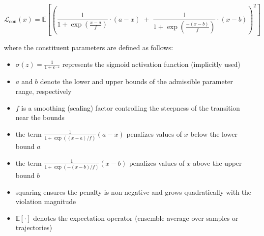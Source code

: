 \documentclass[11pt, oneside]{article}
\begin{document}

\begin{equation}
    \mathcal{L_{\mathrm{con}}}(x) = \mathbb{E}\left[\left(
        \frac{1}{1 + \exp\!\left(\tfrac{x-a}{f}\right)} \cdot (a-x) \;+\;
        \frac{1}{1 + \exp\!\left(\frac{-(x-b)}{f}\right)} \cdot (x-b)
        \right)^{2}\right]
\end{equation}

where the constituent parameters are defined as follows:
\begin{itemize}
    \item $\sigma(z) = \tfrac{1}{1+e^{-z}}$ represents the sigmoid activation function (implicitly used)
    \item $a$ and $b$ denote the lower and upper bounds of the admissible parameter range, respectively
    \item $f$ is a smoothing (scaling) factor controlling the steepness of the transition near the bounds
    \item the term $\tfrac{1}{1+\exp((x-a)/f)}(a-x)$ penalizes values of $x$ below the lower bound $a$
    \item the term $\tfrac{1}{1+\exp(-(x-b)/f)}(x-b)$ penalizes values of $x$ above the upper bound $b$
    \item squaring ensures the penalty is non-negative and grows quadratically with the violation magnitude
    \item $\mathbb{E}[\cdot]$ denotes the expectation operator (ensemble average over samples or trajectories)
\end{itemize}
\end{document}
